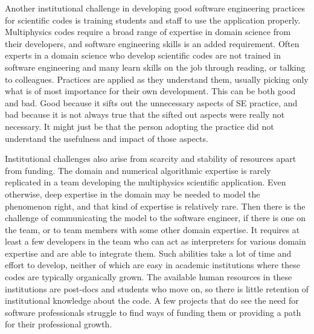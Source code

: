Another institutional challenge in developing good software
engineering practices for scientific codes is training students and staff to
use the application properly. Multiphysics codes require a broad range
of expertise in domain science from their developers, and software
engineering skills is an added requirement.  Often experts in a domain
science who develop scientific codes are not trained in software engineering
and many learn skills on the job through reading, or talking to
colleagues. Practices are applied as they understand them, usually
picking only what is of most importance for their own development.
This can be both good and bad. Good because it sifts out the unnecessary aspects of SE
practice, and bad because it is not always true that the sifted out
aspects were really not necessary. It might just be that the person
adopting the practice did not understand the usefulness and impact of
those aspects.


Institutional challenges also arise from scarcity and stability of
resources apart from funding. The domain and numerical algorithmic
expertise is rarely replicated in a team developing the multiphysics
scientific application.  Even otherwise, deep expertise in the domain may be
needed to model the phenomenon right, and that kind of expertise is
relatively rare. Then there is the challenge of communicating the
model to the software engineer, if there is one on the team, or to
team members with some other domain expertise. It requires at least a
few developers in the team who can act as interpreters for various
domain expertise and are able to integrate them. Such abilities take a
lot of time and effort to develop, neither of which are
easy in academic institutions where these codes are typically
organically grown. The available human resources in these institutions
are post-docs and students who move on, so there is little retention of
institutional knowledge about the code.  A few projects that do see
the need for software professionals struggle to find ways of funding
them or providing a path for their professional growth. 

